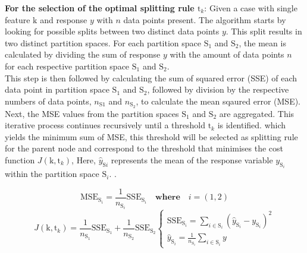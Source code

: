 \textbf{For the selection of the optimal splitting rule $\text{t}_k$}: Given a case with single feature $\text{k}$ and response $y$ with $n$ data points present. The algorithm starts by looking for possible splits between two distinct data points $y$. This split results in two distinct partition spaces. For each partition space $\text{S}_1$ and $\text{S}_2$, the mean is calculated by dividing the sum of response $y$ with the amount of data points $n$ for each respective partition space $\text{S}_1$ and $\text{S}_2$.\\ 

This step is then followed by calculating the sum of squared error (SSE) of each data point in partition space $\text{S}_1$ and $\text{S}_2$, followed by division by the respective numbers of data points, $n_{\text{S}1}$ and $n_{\text{S}_2}$, to calculate the mean sqaured error (MSE). Next, the MSE values from the partition spaces $\text{S}_1$ and $\text{S}_2$ are aggregated. This iterative process continues recursively until a threshold $\text{t}_k$ is identified. which yields the minimum sum of MSE, this threshold will be selected as splitting rule for the parent node and correspond to the threshold that minimises the cost function $J(\text{k},\text{t}_k)$, Here, $\hat{y}_{\text{S}i}$ represents the mean of the response variable $y_{\text{S}_i}$ within the partition space $\text{S}_i$. .

\begin{equation}\label{eqn:sse}
    \text{MSE}_{\text{S}_i} = \frac{1}{n_{\text{S}_i}}\text{SSE}_{\text{S}_i} \quad \textbf{where} \quad i = (1,2)   
\end{equation}
\begin{equation}\label{eqn:costfun}
    J(\text{k},\text{t}_k) = \frac{1}{n_{\text{S}_1}}\text{SSE}_{\text{S}_1} + \frac{1}{n_{\text{S}_2}}\text{SSE}_{\text{S}_2}
    \begin{cases}
        \text{SSE}_{\text{S}_i} = \sum\limits_{i \in \text{S}_i}(\hat{y}_{\text{S}_i} - y_{\text{S}_i} )^2 \\
        \hat{y}_{\text{S}_i} = \frac{1}{n_{\text{S}_i}}\sum\limits_{i\in \text{S}_i} y
    \end{cases}  
\end{equation}

